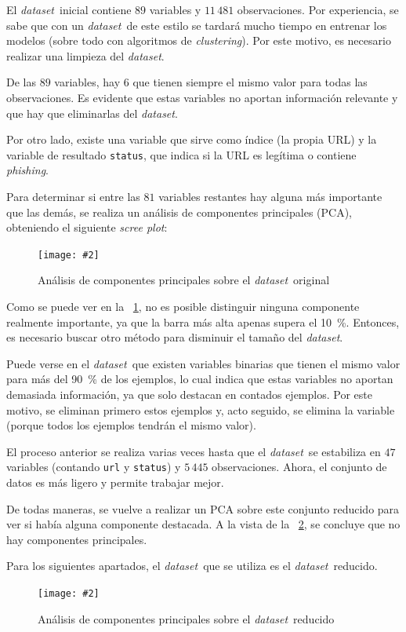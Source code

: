\documentclass[12pt, a4paper]{article}
\renewcommand{\textit}{\textsl}
\newcommand*{\figref}[1]{\figurename~\ref{fig:#1}}
\newcommand{\figcaption}[4][H]{
  \begin{figure}[#1]
    \centering
    \texttt{[image: \#2]}
    \caption{#3}
    \label{fig:#2}
  \end{figure}
}
\newcommand*{\clustering}{\textit{clustering}}
\newcommand*{\dataset}{\textit{dataset}}
\newcommand*{\phishing}{\textit{phishing}}
\begin{document}
    El \dataset\ inicial contiene $89$ variables y $11\,481$ observaciones. Por experiencia, se sabe que con un \dataset\ de este estilo se tardará mucho tiempo en entrenar los modelos (sobre todo con algoritmos de \clustering). Por este motivo, es necesario realizar una limpieza del \dataset.

    De las $89$ variables, hay $6$ que tienen siempre el mismo valor para todas las observaciones. Es evidente que estas variables no aportan información relevante y que hay que eliminarlas del \dataset.

    Por otro lado, existe una variable que sirve como índice (la propia URL) y la variable de resultado \texttt{status}, que indica si la URL es legítima o contiene \phishing.

    Para determinar si entre las $81$ variables restantes hay alguna más importante que las demás, se realiza un análisis de componentes principales (PCA), obteniendo el siguiente \textit{scree plot}:

    \figcaption{pca1.png}{Análisis de componentes principales sobre el \dataset\ original}{1}

    Como se puede ver en la \figref{pca1.png}, no es posible distinguir ninguna componente realmente importante, ya que la barra más alta apenas supera el \SI{10}{\percent}. Entonces, es necesario buscar otro método para disminuir el tamaño del \dataset.

    Puede verse en el \dataset\ que existen variables binarias que tienen el mismo valor para más del \SI{90}{\percent} de los ejemplos, lo cual indica que estas variables no aportan demasiada información, ya que solo destacan en contados ejemplos. Por este motivo, se eliminan primero estos ejemplos y, acto seguido, se elimina la variable (porque todos los ejemplos tendrán el mismo valor).

    El proceso anterior se realiza varias veces hasta que el \dataset\ se estabiliza en $47$ variables (contando \texttt{url} y \texttt{status}) y $5\,445$ observaciones. Ahora, el conjunto de datos es más ligero y permite trabajar mejor.

    De todas maneras, se vuelve a realizar un PCA sobre este conjunto reducido para ver si había alguna componente destacada. A la vista de la \figref{pca2.png}, se concluye que no hay componentes principales.

    Para los siguientes apartados, el \dataset\ que se utiliza es el \dataset\ reducido.

    \figcaption{pca2.png}{Análisis de componentes principales sobre el \dataset\ reducido}{1}
\end{document}
